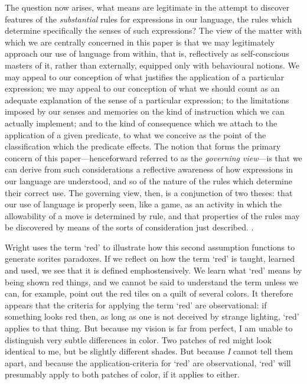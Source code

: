 \documentclass[11pt]{standalone}
\newenvironment{squote}{%
\begin{spacing}{1}
       	\begin{list}{}{%
\setlength{\labelwidth}{0pt}%
\rightmargin\leftmargin%
}
\item\relax
}{%
\end{list}%
\end{spacing}
}
\begin{document}
\begin{spacing}{1.5}
\begin{squote}
The question now arises, what means are legitimate in the attempt to
discover features of the \emph{substantial} rules for expressions in
our language, the rules which determine specifically the senses of
such expressions?  The view of the matter with which we are centrally
concerned in this paper is that we may legitimately approach our use
of language from within, that is, reflectively as self-conscious
masters of it, rather than externally, equipped only with behavioural
notions.  We may appeal to our conception of what justifies the
application of a particular expression; we may appeal to our
conception of what we should count as an adequate explanation of the
sense of a particular expression; to the limitations imposed by our
senses and memories on the kind of instruction which we can actually
implement; and to the kind of consequence which we attach to the
application of a given predicate, to what we conceive as the point of
the classification which the predicate effects.  The notion that forms
the primary concern of this paper---henceforward referred to as the
\emph{governing view}---is that we can derive from such considerations
a reflective awareness of how expressions in our language are
understood, and so of the nature of the rules which determine their
correct use.  The governing view, then, is a conjunction of two
theses: that our use of language is properly seen, like a game, as an
activity in which the allowability of a move is determined by rule,
and that properties of the rules may be discovered by means of the
sorts of consideration just described. \citep[327]{wright1975}.
\end{squote}

Wright uses the term `red' to illustrate how this second assumption
functions to generate sorites paradoxes.  If we reflect on how the
term `red' is taught, learned and used, we see that it is defined
emph{ostensively}.  We learn what `red' means by being shown red
things, and we cannot be said to understand the term unless we can,
for example, point out the red tiles on a quilt of several colors.  It
therefore appears that the criteria for applying the term `red' are
observational: if something looks red then, as long as one is not
deceived by strange lighting, `red' applies to that thing.  But
because my vision is far from perfect, I am unable to distinguish very
subtle differences in color.  Two patches of red might look identical
to me, but be slightly different shades.  But because \emph{I} cannot
tell them apart, and because the application-criteria for `red' are
observational, `red' will presumably apply to both patches of color,
if it applies to either.


\end{spacing}
\end{document}
